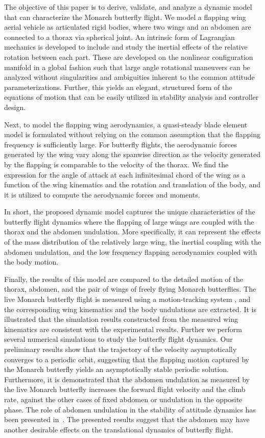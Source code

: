 \documentclass[conf]{new-aiaa}
\begin{document}
The objective of this paper is to derive, validate, and analyze a dynamic model that can characterize the Monarch butterfly flight.
We model a flapping wing aerial vehicle as articulated rigid bodies, where two wings and an abdomen are connected to a thorax via spherical joint.
An intrinsic form of Lagrangian mechanics is developed to include and study the inertial effects of the relative rotation between each part.
These are developed on the nonlinear configuration manifold in a global fashion such that large angle rotational maneuvers can be analyzed without singularities and ambiguities inherent to the common attitude parameterizations. 
Further, this yields an elegant, structured form of the equations of motion that can be easily utilized in stability analysis and controller design. 

Next, to model the flapping wing aerodynamics, a quasi-steady blade element model is formulated without relying on the common assumption that the flapping frequency is sufficiently large.
For butterfly flights, the aerodynamic forces generated by the wing vary along the spanwise direction as the velocity generated by the flapping is comparable to the velocity of the thorax. 
We find the expression for the angle of attack at each infinitesimal chord of the wing as a function of the wing kinematics and the rotation and translation of the body, and it is utilized to compute the aerodynamic forces and moments. 

In short, the proposed dynamic model captures the unique characteristics of the butterfly flight dynamics where the flapping of large wings are coupled with the thorax and the abdomen undulation.
More specifically, it can represent the effects of the mass distribution of the relatively large wing, the inertial coupling with the abdomen undulation, and the low frequency flapping aerodynamics coupled with the body motion. 

Finally, the results of this model are compared to the detailed motion of the thorax, abdomen, and the pair of wings of freely flying Monarch butterflies.
The live Monarch butterfly flight is measured using a motion-tracking system \cite{kang2017aiaaj}, and the corresponding wing kinematics and the body undulations are extracted. 
It is illustrated that the simulation results constructed from the measured wing kinematics are consistent with the experimental results.  
Further we perform several numerical simulations to study the butterfly flight dynamics.
Our preliminary results show that the trajectory of the velocity asymptotically converges to a periodic orbit, suggesting that the flapping motion captured by the Monarch butterfly yields an asymptotically stable periodic solution.
Furthermore, it is demonstrated that the abdomen undulation as measured by the live Monarch butterfly increases the forward flight velocity and the climb rate, against the other cases of fixed abdomen or undulation in the opposite phase. 
The role of abdomen undulation in the stability of attitude dynamics has been presented in~\cite{dyhr2013flexible}.
The presented results suggest that the abdomen may have another desirable effects on the translational dynamics of butterfly flight. 
\end{document}
